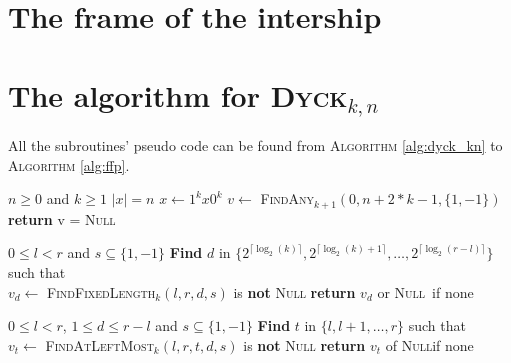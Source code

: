 \documentclass[11pt,a4paper]{article}
\newcommand{\Dyck}[1]{\textsc{Dyck$_{#1}$}}
\newcommand{\FA}[1]{\textsc{FindAny$_{#1}$}}
\newcommand{\FFL}[1]{\textsc{FindFixedLength$_{#1}$}}
\newcommand{\FALM}[1]{\textsc{FindAtLeftMost$_{#1}$}}
\newcommand{\Null}{\textsc{Null}}
\theoremstyle{definition}
\theoremstyle{plain}
\theoremstyle{definition}
\begin{document}
\begin{appendix}

    \section*{The frame of the intership}

    \section{The algorithm for \Dyck{k, n}}
    \label{annex:complete_subroutine_dyck_kn}
    All the subroutines' pseudo code can be found from \textsc{Algorithm}
    \autoref{alg:dyck_kn} to \textsc{Algorithm} \autoref{alg:ffp}.

    \begin{algorithm}
        \caption{\Dyck{k,n}}\label{alg:dyck_kn}
        \begin{algorithmic}
            \Require $n \geq 0$ and $k \geq 1$
            \Ensure $|x| = n $
            \State $x \gets 1^kx0^k$
            \State $v \gets$ \FA{k+1}$(0, n+2*k-1, \{1,-1\})$
            \State \textbf{return} v = \Null
        \end{algorithmic}
    \end{algorithm}

    \begin{algorithm}
        \caption{\FA{k}$(l,r,s)$}\label{alg:fa_k}
        \begin{algorithmic}
            \Require $0 \leq l < r$ and $s \subseteq \{1,-1\}$
            \State \textbf{Find} $d$ in $\{2^{\lceil \log_2(k)\rceil }, 2^{\lceil \log_2(k)+1\rceil },\ldots,2^{\lceil \log_2(r-l)\rceil }\}$
            such that \\
            \hspace*{1cm} $v_d \gets $ \FFL{k}$(l,r,d,s)$ is \textbf{not} \Null
            \State \textbf{return} $v_d$ or \Null \ if none
        \end{algorithmic}
    \end{algorithm}

    \begin{algorithm}
        \caption{\FFL{k}$(l,r,d,s)$}\label{alg:ffl_k}
        \begin{algorithmic}
            \Require $0 \leq l < r$, $1\leq d \leq r-l$ and $s \subseteq \{1,-1\}$
            \State \textbf{Find} $t$ in $\{l, l+1, \dots, r\}$ such that \\
            \hspace*{1cm} $v_t \gets$ \FALM{k}$(l,r,t,d,s)$ is \textbf{not} \Null
            \State \textbf{return} $v_t$ of \Null if none
        \end{algorithmic}
    \end{algorithm}


\end{appendix}
\end{document}
